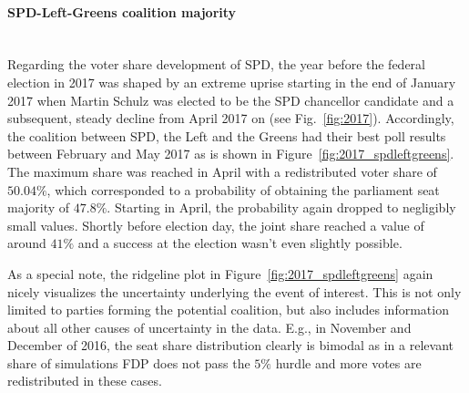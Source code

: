 \documentclass[smallcondensed]{svjour3}     %
\begin{document}
\paragraph{SPD-Left-Greens coalition majority} \ \\
Regarding the voter share development of SPD, the year before
the federal election in 2017 was shaped by an extreme uprise starting
in the end of January 2017 when Martin Schulz was elected to be the SPD chancellor
candidate and a subsequent, steady decline from April 2017 on (see Fig.~\ref{fig:2017}).
Accordingly, the coalition between SPD, the Left and the Greens had
their best poll results between February and May 2017 as is shown in Figure~\ref{fig:2017_spdleftgreens}.
The maximum share was reached in April with a redistributed voter
share of $50.04\%$, which corresponded to a probability of obtaining the
parliament seat majority of $47.8\%$.
Starting in April, the probability again dropped to negligibly small values.
Shortly before election day, the joint share
reached a value of around $41\%$ and a success at the election wasn't even
slightly possible.

As a special note, the ridgeline plot in Figure~\ref{fig:2017_spdleftgreens}
again nicely visualizes the uncertainty underlying the event of
interest. This is not only limited to parties forming the potential coalition,
but also includes information about all other causes of uncertainty in the data.
E.g., in November and December of 2016, the seat share distribution clearly
is bimodal as in a relevant share of simulations FDP does not pass
the $5\%$ hurdle and more votes are redistributed in these cases.
\end{document}
